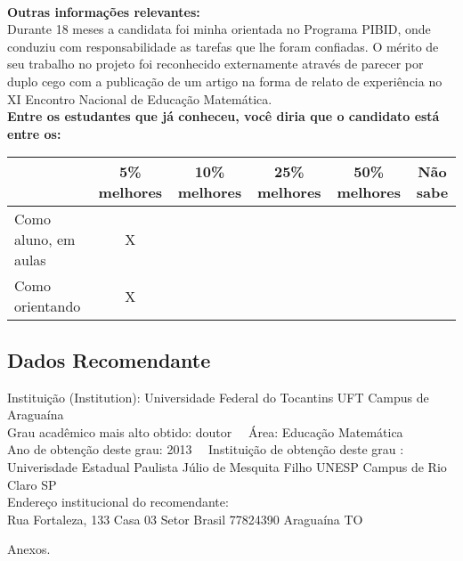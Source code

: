 \documentclass[11pt]{article}
\begin{document}
\\
\textbf{Outras informações relevantes:} \\Durante 18 meses a candidata foi minha orientada no Programa PIBID, onde conduziu com responsabilidade as tarefas que lhe foram confiadas. O mérito de seu trabalho no projeto foi reconhecido externamente através de parecer por duplo cego com a publicação de um artigo na forma de relato de experiência no XI Encontro Nacional de Educação Matemática. 
\\[0.3cm]
\textbf{Entre os estudantes que já conheceu, você diria que o candidato está entre os:}
\\
\begin{tabular}{|l|c|c|c|c|c|}
\hline
 & 5\% melhores & 10\% melhores & 25\% melhores & 50\% melhores & Não sabe \\
\hline
Como aluno, em aulas & X &  &  &  & \\
\hline
Como orientando & X &  &  &  & \\
\hline
\end{tabular}
\subsection*{Dados Recomendante} 
	Instituição (Institution): Universidade Federal do Tocantins  UFT Campus de Araguaína
\\ 
	Grau acadêmico mais alto obtido: doutor
	\ \ Área: Educação Matemática
	\\
	Ano de obtenção deste grau: 2013
	\ \ 
	Instituição de obtenção deste grau : Univerisdade Estadual Paulista Júlio de Mesquita Filho UNESP Campus de Rio Claro SP
	\\ 
	Endereço institucional do recomendante: \\ Rua Fortaleza, 133 Casa 03 Setor Brasil
77824390 Araguaína TO 
\begin{center}
Anexos.
\end{center}
\end{document}
